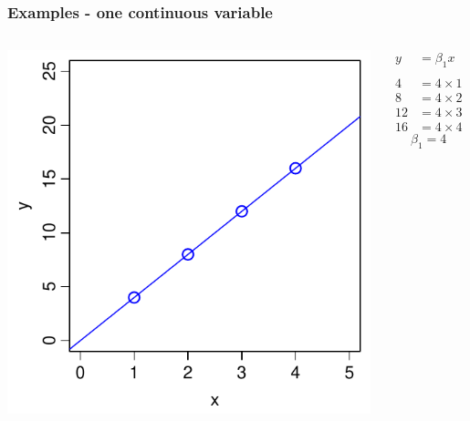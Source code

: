 \documentclass[aspectratio=43]{beamer}
\begin{document}
\frame
{\frametitle{Examples - one continuous variable}

\begin{columns}[T]

		\includegraphics[width=\textwidth]{Origin.pdf}
		
		\begin{align*}
		  y  &=  \beta_1 x \\
		  \\
		  4  &=  4 \times 1 \\
		  8  &=  4 \times 2 \\
		  12 &=  4 \times 3 \\
		  16 &=  4 \times 4   
		\end{align*}
		\[\beta_1 =4\]
\end{columns}
}
\end{document}
